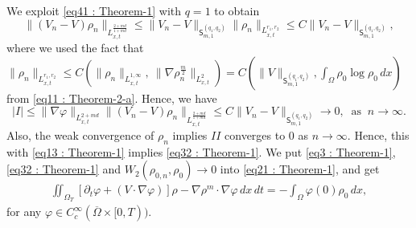 \documentclass{amsart}
\numberwithin{equation}{section}
\begin{document}
 We exploit \eqref{eq41 : Theorem-1} with $q=1$ to obtain
 \begin{equation}\label{eq28 : Theorem-1}
\|(V_n-V)\rho_n \|_{L_{x,t}^{\frac{2+md}{1+md}}}
\leq \|V_n-V \|_{{\mathsf{S}}_{m,1}^{({q}_1, {q}_2)}} \| \rho_n\|_{L_{x,t}^{r_1, r_2}}
 \leq C %
\|V_n-V \|_{\mathsf{S}_{m,1}^{(q_1,q_2)}} ,
\end{equation}
where we used the fact that $\| \rho_n\|_{L_{x,t}^{r_1, r_2}} \leq C (\|\rho_n\|_{L_{x,t}^{1,\infty}},~ \|\nabla \rho_n^{\frac{m}{2}}\|_{L_{x,t}^{2}})
=C (\|V\|_{\mathsf{S}_{m, 1}^{(q_1,q_2)}}, \int_{\Omega} \rho_{0} \log \rho_{0} \,dx )$ from \eqref{eq11 : Theorem-2-a}.
Hence, we have
\begin{equation}\label{eq13 : Theorem-1}
| I |\leq \|\nabla \varphi \|_{L_{x,t}^{2+md}} \|(V_n - V)\rho_n \|_{L_{x,t}^{\frac{2+md}{1+md}}}
\leq C \|V_n - V \|_{\mathsf{S}_{m,1}^{(q_1,q_2)}} \longrightarrow 0,  \  \mbox{ as } \   n\rightarrow \infty.
\end{equation}
Also, the weak convergence of $\rho_n$ implies $II$ converges to $0$ as $n \rightarrow \infty$.  Hence, this with \eqref{eq13 : Theorem-1} implies \eqref{eq32 : Theorem-1}.
 We put \eqref{eq3 : Theorem-1}, \eqref{eq32 : Theorem-1} and $W_2(\rho_{0,n}, \rho_0) \rightarrow 0$ into \eqref{eq21 : Theorem-1}, and get
\begin{equation*}\label{eq10 : Theorem-1}
\begin{aligned}
\iint_{\Omega_T}  \left [\partial_t\varphi + (V \cdot \nabla \varphi )\right ]\rho
 - \nabla \rho^m  \cdot \nabla \varphi  \,dx\,dt
 =  - \int_{\Omega}\varphi(0) \rho_{0}\,dx,
\end{aligned}
\end{equation*}
for any $\varphi\in C_c^\infty( \overline{\Omega} \times [0,T))$.
\end{document}

